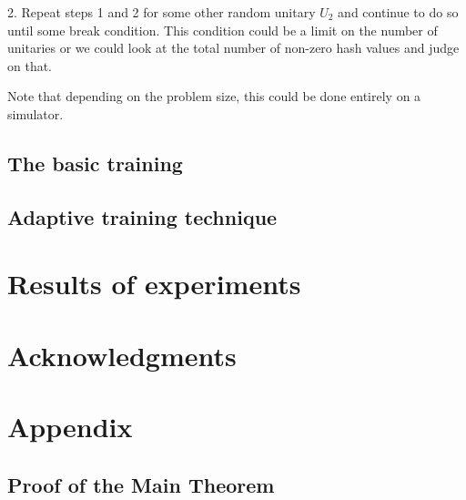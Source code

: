\documentclass[pra,twocolumn,superscriptaddress,longbibliography]{revtex4-2}
\theoremstyle{remark}
\numberwithin{equation}{section}
\begin{document}
2. Repeat steps 1 and 2 for some other random unitary $U_2$ and continue to do so until some break condition.  
This condition could be a limit on the number of unitaries or we could look at the total number of non-zero hash values 
and judge on that. 



Note that depending on the problem size, this could be done entirely on a simulator. 

\subsection{The basic training}

\subsection{Adaptive training technique}

\section{Results of experiments}\label{sec:res}


\onecolumngrid

\quad 

\section{Acknowledgments}

\quad

\section{Appendix}

\subsection{Proof of the Main Theorem}\label{sec:proof}
\end{document}
